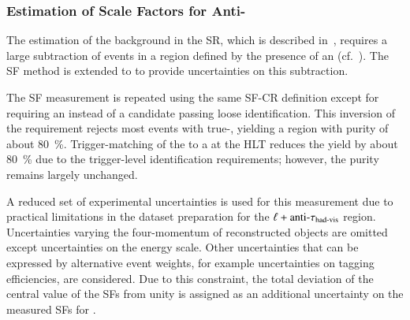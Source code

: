 \subsubsection{Estimation of \Faketauhadvis Scale Factors for Anti-\tauhadvis}

The estimation of the \multijet background in the \hadhad SR, which is described
in~, requires a large subtraction of \ttbarFakes events
in a region defined by the presence of an \antitau
(cf.~). The SF method is extended to \antitau to
provide uncertainties on this subtraction.

The SF measurement is repeated using the same SF-CR definition except for
requiring an \antitau instead of a \tauhadvis candidate passing loose
identification.
This inversion of the \tauid requirement rejects most \ttbar events with
true-\tauhadvis, yielding a region with \ttbarFakes purity of about
\SI{80}{\percent}. Trigger-matching of the \antitau to a \tauhadvis at the HLT
reduces the \ttbarFakes yield by about \SI{80}{\percent} due to the
trigger-level identification requirements; however, the \ttbarFakes purity
remains largely unchanged.

A reduced set of experimental uncertainties is used for this measurement due to
practical limitations in the dataset preparation for the
$\ell + \text{anti-}\tau_{\text{had-vis}}$ region. Uncertainties varying the four-momentum
of reconstructed objects are omitted except uncertainties on the \tauhadvis
energy scale. Other uncertainties that can be expressed by alternative event
weights, for example uncertainties on tagging efficiencies, are considered. Due
to this constraint, the total deviation of the central value of the SFs from
unity is assigned as an additional uncertainty on the measured SFs for \antitau.

